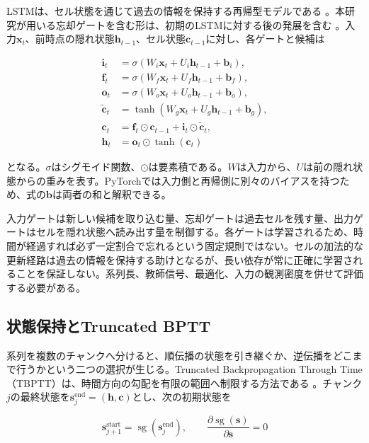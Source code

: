 LSTMは、セル状態を通じて過去の情報を保持する再帰型モデルである \autocite{hochreiter1997lstm}。本研究が用いる忘却ゲートを含む形は、初期のLSTMに対する後の発展を含む \autocite{gers2000forget}。入力\(\boldsymbol{x}_t\)、前時点の隠れ状態\(\boldsymbol{h}_{t-1}\)、セル状態\(\boldsymbol{c}_{t-1}\)に対し、各ゲートと候補は

\[
\begin{aligned}
\boldsymbol{i}_t&=\sigma(W_i\boldsymbol{x}_t+U_i\boldsymbol{h}_{t-1}+\boldsymbol{b}_i),\\
\boldsymbol{f}_t&=\sigma(W_f\boldsymbol{x}_t+U_f\boldsymbol{h}_{t-1}+\boldsymbol{b}_f),\\
\boldsymbol{o}_t&=\sigma(W_o\boldsymbol{x}_t+U_o\boldsymbol{h}_{t-1}+\boldsymbol{b}_o),\\
\widetilde{\boldsymbol{c}}_t&=\tanh(W_g\boldsymbol{x}_t+U_g\boldsymbol{h}_{t-1}+\boldsymbol{b}_g),\\
\boldsymbol{c}_t&=\boldsymbol{f}_t\odot\boldsymbol{c}_{t-1}
+\boldsymbol{i}_t\odot\widetilde{\boldsymbol{c}}_t,\\
\boldsymbol{h}_t&=\boldsymbol{o}_t\odot\tanh(\boldsymbol{c}_t)
\end{aligned}
\]

となる。\(\sigma\)はシグモイド関数、\(\odot\)は要素積である。\(W\)は入力から、\(U\)は前の隠れ状態からの重みを表す。PyTorchでは入力側と再帰側に別々のバイアスを持つため、式の\(\boldsymbol{b}\)は両者の和と解釈できる。

入力ゲートは新しい候補を取り込む量、忘却ゲートは過去セルを残す量、出力ゲートはセルを隠れ状態へ読み出す量を制御する。各ゲートは学習されるため、時間が経過すれば必ず一定割合で忘れるという固定規則ではない。セルの加法的な更新経路は過去の情報を保持する助けとなるが、長い依存が常に正確に学習されることを保証しない。系列長、教師信号、最適化、入力の観測密度を併せて評価する必要がある。

\subsection{状態保持とTruncated BPTT}

系列を複数のチャンクへ分けると、順伝播の状態を引き継ぐか、逆伝播をどこまで行うかという二つの選択が生じる。Truncated Backpropagation Through Time（TBPTT）は、時間方向の勾配を有限の範囲へ制限する方法である \autocite{williams1990tbptt}。チャンク\(j\)の最終状態を\(\boldsymbol{s}_{j}^{\mathrm{end}}=(\boldsymbol{h},\boldsymbol{c})\)とし、次の初期状態を

\[
\boldsymbol{s}_{j+1}^{\mathrm{start}}
=\operatorname{sg}(\boldsymbol{s}_{j}^{\mathrm{end}}),\qquad
\frac{\partial\operatorname{sg}(\boldsymbol{s})}{\partial\boldsymbol{s}}=0
\]

